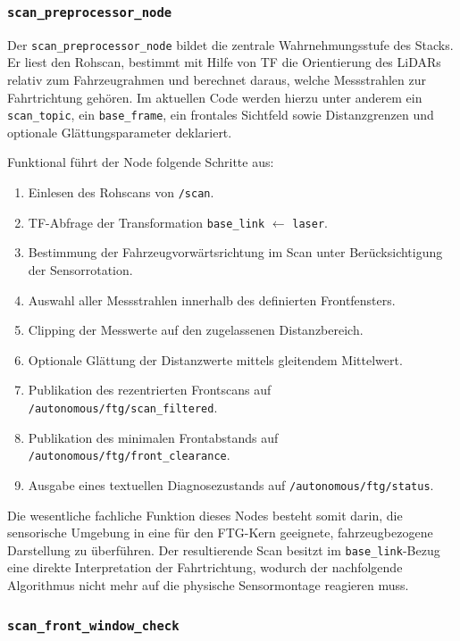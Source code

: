 \subsubsection*{\texttt{scan\_preprocessor\_node}}

Der \texttt{scan\_preprocessor\_node} bildet die zentrale Wahrnehmungsstufe des Stacks. Er liest den Rohscan, bestimmt mit Hilfe von TF die Orientierung des LiDARs relativ zum Fahrzeugrahmen und berechnet daraus, welche Messstrahlen zur Fahrtrichtung gehören. Im aktuellen Code werden hierzu unter anderem ein \texttt{scan\_topic}, ein \texttt{base\_frame}, ein frontales Sichtfeld sowie Distanzgrenzen und optionale Glättungsparameter deklariert.

Funktional führt der Node folgende Schritte aus:

\begin{enumerate}
    \item Einlesen des Rohscans von \texttt{/scan}.
    \item TF-Abfrage der Transformation \texttt{base\_link} $\leftarrow$ \texttt{laser}.
    \item Bestimmung der Fahrzeugvorwärtsrichtung im Scan unter Berücksichtigung der Sensorrotation.
    \item Auswahl aller Messstrahlen innerhalb des definierten Frontfensters.
    \item Clipping der Messwerte auf den zugelassenen Distanzbereich.
    \item Optionale Glättung der Distanzwerte mittels gleitendem Mittelwert.
    \item Publikation des rezentrierten Frontscans auf \texttt{/autonomous/ftg/scan\_filtered}.
    \item Publikation des minimalen Frontabstands auf \texttt{/autonomous/ftg/front\_clearance}.
    \item Ausgabe eines textuellen Diagnosezustands auf \texttt{/autonomous/ftg/status}.
\end{enumerate}

Die wesentliche fachliche Funktion dieses Nodes besteht somit darin, die sensorische Umgebung in eine für den FTG-Kern geeignete, fahrzeugbezogene Darstellung zu überführen. Der resultierende Scan besitzt im \texttt{base\_link}-Bezug eine direkte Interpretation der Fahrtrichtung, wodurch der nachfolgende Algorithmus nicht mehr auf die physische Sensormontage reagieren muss.

\subsubsection*{\texttt{scan\_front\_window\_check}}

